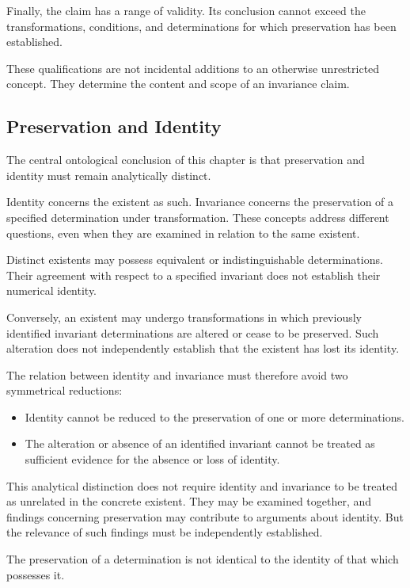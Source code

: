 Finally, the claim has a range of validity. Its
conclusion cannot exceed the transformations,
conditions, and determinations for which preservation
has been established.

These qualifications are not incidental additions
to an otherwise unrestricted concept. They determine
the content and scope of an invariance claim.

\subsection{Preservation and Identity}

The central ontological conclusion of this chapter
is that preservation and identity must remain
analytically distinct.

Identity concerns the existent as such. Invariance
concerns the preservation of a specified determination
under transformation. These concepts address different
questions, even when they are examined in relation
to the same existent.

Distinct existents may possess equivalent or
indistinguishable determinations. Their agreement
with respect to a specified invariant does not
establish their numerical identity.

Conversely, an existent may undergo transformations
in which previously identified invariant determinations
are altered or cease to be preserved. Such alteration
does not independently establish that the existent
has lost its identity.

The relation between identity and invariance must
therefore avoid two symmetrical reductions:

\begin{itemize}
    \item Identity cannot be reduced to the preservation
          of one or more determinations.
    \item The alteration or absence of an identified
          invariant cannot be treated as sufficient
          evidence for the absence or loss of identity.
\end{itemize}

This analytical distinction does not require identity
and invariance to be treated as unrelated in the
concrete existent. They may be examined together,
and findings concerning preservation may contribute
to arguments about identity. But the relevance of
such findings must be independently established.

The preservation of a determination is not identical
to the identity of that which possesses it.

